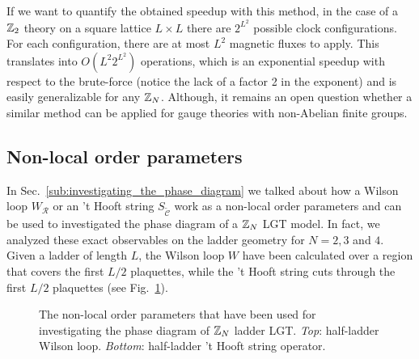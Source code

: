 If we want to quantify the obtained speedup with this method, in the case of a $\mathbb{Z}_2$ theory on a square lattice $L \times L$ there are $2^{L^2}$ possible clock configurations.
For each configuration, there are at most $L^2$ magnetic fluxes to apply.
This translates into $O(L^2 2^{L^2})$ operations, which is an exponential speedup with respect to the brute-force (notice the lack of a factor 2 in the exponent) and is easily generalizable for any $\mathbb{Z}_N$.
Although, it remains an open question whether a similar method can be applied for gauge theories with non-Abelian finite groups.



\subsection{Non-local order parameters}%
\label{sub:non_local_order_parameters}

In Sec.~\ref{sub:investigating_the_phase_diagram} we talked about how a Wilson loop $W_{\mathcal{R}}$ or an 't Hooft string $S_{\tilde{\mathcal{C}}}$ work as a non-local order parameters and can be used to investigated the phase diagram of a $\mathbb{Z}_N$ LGT model.
In fact, we analyzed these exact observables on the ladder geometry for $N = 2,3$ and $4$.
Given a ladder of length $L$, the Wilson loop $W$ have been calculated over a region that covers the first $L/2$ plaquettes, while the 't Hooft string cuts through the first $L/2$ plaquettes (see Fig.~\ref{fig:nlop_ladder}).

\begin{figure}[h]
    \centering
    
    \caption{The non-local order parameters that have been used for investigating the phase diagram of $\mathbb{Z}_N$ ladder LGT.
    \emph{Top}: half-ladder Wilson loop.
    \emph{Bottom}: half-ladder 't Hooft string operator.}%
    \label{fig:nlop_ladder}
\end{figure}
